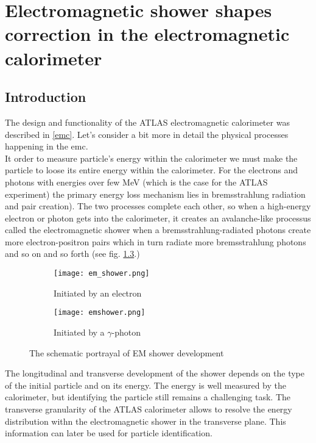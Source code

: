 \chapter{Electromagnetic shower shapes correction in the electromagnetic calorimeter }

  \section{Introduction}
  The design and functionality of the ATLAS electromagnetic calorimeter was described in \ref{emc}. Let's consider a bit more in detail the physical processes happening in the \gls{emc}. \\
  It order to measure particle's energy within the calorimeter we must make the particle to loose its entire energy within the calorimeter. For the electrons and photons with energies over few MeV (which is the case for the ATLAS experiment) the primary energy loss mechanism lies in bremsstrahlung radiation and pair creation). The two processes complete each other, so when a high-energy electron or photon gets into the calorimeter, it creates an avalanche-like processus called the electromagnetic shower when a bremsstrahlung-radiated photons create more electron-positron pairs which in turn radiate more bremsstrahlung photons and so on and so forth (see fig. \ref{fig::em_shower}.)\\
  	\begin{figure}[htbp]
  	\begin{subfigure}[t]{0.5\textwidth}
  		\texttt{[image: em\_shower.png]}
  		\caption[Started by an electron]{Initiated by an electron}
  		\label{fig::id}
  	\end{subfigure}
  	\hfill
  	\begin{subfigure}[t]{0.5\textwidth} 
  		\texttt{[image: emshower.png]}
  		\caption[Started by a $\gamma$-photon]{Initiated by a $\gamma$-photon}
  		\label{fig::pd}
  	\end{subfigure}
  	\caption{The schematic portrayal of EM shower development}
  	\label{fig::em_shower}
  \end{figure}
    The longitudinal and transverse development of the shower depends on the type of the initial particle and on its energy. The energy is well measured by the calorimeter, but identifying the particle still remains a challenging task. The transverse granularity of the ATLAS calorimeter allows to resolve the energy distribution withn the electromagnetic shower in the transverse plane. This information can later be used for particle identification.\\
